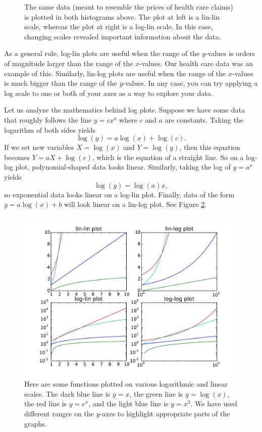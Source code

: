 \begin{figure}
\begin{subfigure}{.5\textwidth}
\end{subfigure}
\caption{The same data (meant to resemble the prices of health care claims) is plotted in both histograms above. 
The plot at left is a lin-lin scale, whereas the plot at right is a log-lin scale. 
In this case, changing scales revealed important information about the data.}
\label{fig:healthcare}
\end{figure}

As a general rule, log-lin plots are useful when the range of the $y$-values is orders of magnitude larger than the range of the $x$-values. 
Our health care data was an example of this. 
Similarly, lin-log plots are useful when the range of the $x$-values is much bigger than the range of the $y$-values. 
In any case, you can try applying a log scale to one or both of your axes as a way to explore your data.

Let us analyze the mathematics behind log plots. 
Suppose we have some data that roughly follows the line $y=cx^a$ where $c$ and $a$ are constants. 
Taking the logarithm of both sides yields
\[
\log(y) = a\log(x) + \log(c).
\]
If we set new variables $X = \log(x)$ and $Y = \log(y)$, then this equation becomes $Y = aX + \log(c)$, which is the equation of a straight line. 
So  on a log-log plot, polynomial-shaped data looks linear. 
Similarly, taking the log of $y = a^x$ yields
\[
\log(y) = \log(a)x,
\]
so exponential data looks linear on a log-lin plot. 
Finally, data of the form $y = a\log(x)+b$ will look linear on a lin-log plot. 
See Figure \ref{fig:log_plots}.

\begin{figure}
\centering
\includegraphics[width=\textwidth]{log_plots.pdf}
\caption{Here are some functions plotted on various logarithmic and linear scales. 
The dark blue line is $y=x$, the green line is $y=\log(x)$, the red line is $y=e^x$, and the light blue line is $y=x^3$. 
We have used different ranges on the $y$-axes to highlight appropriate parts of the graphs.}
\label{fig:log_plots}
\end{figure}

